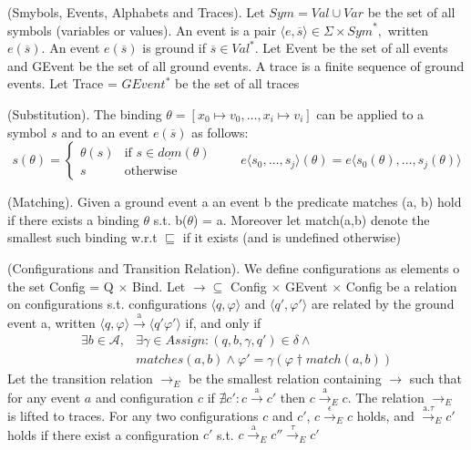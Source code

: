 			\begin{dfn}
				(Smybols, Events, Alphabets and Traces).
				Let $\mathit{Sym} = \mathit{Val} \cup \mathit{Var}$ be the set of all symbols (variables or values).
				An event is a pair $\langle e, \overline{s} \rangle \in \Sigma \times \mathit{Sym}^\ast,$ written $e(\overline{s})$.
				An event $e(\overline{s})$ is ground if $\overline{s} \in \mathit{Val}^\ast$.
				Let Event be the set of all events and GEvent be the set of all ground events.
				A trace is a finite sequence of ground events.
				Let Trace = $GEvent^\ast$ be the set of all traces
			\end{dfn}
			
			\begin{dfn}
				(Substitution).
				The binding $\theta = [x_0 \mapsto v_0, \dots, x_i \mapsto v_i]$ can be applied to a symbol $s$ and to an event
				$e(\overline{s})$ as follows: 
				\[
				 s(\theta) = 
				  \begin{cases} 
				   \theta(s) & \text{if } s \in \underline{dom}(\theta) \\
				   s & \text{otherwise}
				  \end{cases}
				  \qquad e \langle s_0,\ldots,s_j \rangle (\theta) = e \langle s_0(\theta),\ldots,s_j(\theta) \rangle
				\]
			\end{dfn}
			
			\begin{dfn}
				(Matching).
				Given a ground event a an event b the predicate matches (a, b) hold if there exists a binding $\theta$ s.t. b($\theta$) = a.
				Moreover let match(a,b) denote the smallest such binding w.r.t $\sqsubseteq$ if it exists (and is undefined otherwise)
			\end{dfn}
			
			\begin{dfn}
				(Configurations and Transition Relation).
				We define configurations as elements o the set Config = Q $\times$ Bind. Let $\rightarrow \subseteq$ Config $\times$ GEvent $\times$ Config be a relation on
				configurations s.t. configurations $\langle q, \varphi \rangle$ and $\langle q', \varphi' \rangle$ are related by the ground event a, written
				$\langle q, \varphi \rangle \xrightarrow{\text{a}} \langle q' \varphi' \rangle$ if, and only if
					\begin{align}
						\exists b \in \mathcal{A}, & \exists \gamma \in Assign : (q, b, \gamma, q') \in \delta \wedge \\
						&matches(a,b) \wedge \varphi' = \gamma(\varphi \dagger match(a,b))
					\end{align}
				Let the transition relation $\rightarrow_{E}$ be the smallest relation containing $\rightarrow$ such that for any event
				$a$ and configuration $c$ if $\nexists c' : c \xrightarrow{\text{a}} c'$ then $ c \xrightarrow{\text{a}}_E c$.
				The relation $\rightarrow_E$ is lifted to traces.
				For any two configurations $c$ and $c'$, $ c \xrightarrow{\text{$\epsilon$}}_E c$ holds, and $\xrightarrow{\text{a.$\tau$}}_E c'$ holds
				if there exist a configuration $c'$ s.t. $c \xrightarrow{\text{a}}_E c'' \xrightarrow{\text{$\tau$}}_E c'$
			\end{dfn}
			
